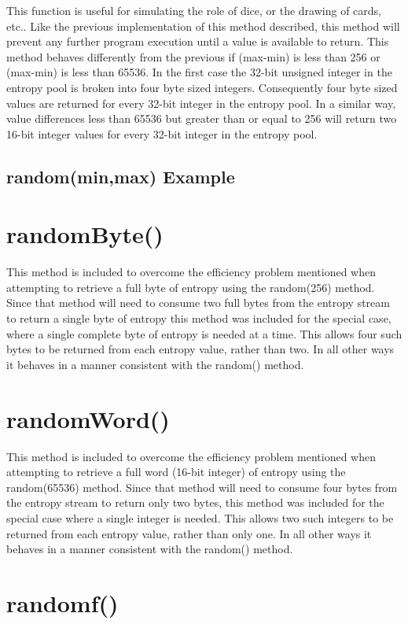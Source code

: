 \documentclass[10pt]{report}
\newcommand{\code}[2]{
 \hrulefill
 \subsection*{#1}
 
 \vspace{2em}
}
\begin{document}
This function is useful for simulating the role of dice, or the drawing of cards, etc..  Like the previous 
implementation of this method described, this method will prevent any further program execution until a value 
is available to return.  This method behaves differently from the previous if (max-min) is less than 256 or 
(max-min) is less than 65536.  In the first case the 32-bit unsigned integer in the entropy pool is broken 
into four byte sized integers. Consequently four byte sized values are returned for every 32-bit integer in 
the entropy pool.  In a similar way, value differences less than 65536 but greater than or equal to 256 will 
return two 16-bit integer values for every 32-bit integer in the entropy pool. 

\code{random(min,max) Example}{random_minmax_example.ino}

\section{randomByte()} 

This method is included to overcome the efficiency problem mentioned when attempting to retrieve a full byte 
of entropy using the random(256) method.  Since that method will need to consume two full bytes from the 
entropy stream to return a single byte of entropy this method was included for the special case, where a 
single complete byte of entropy is needed at a time.  This allows four such bytes to be returned from each 
entropy value, rather than two.  In all other ways it behaves in a manner consistent with the random() 
method.

\section{randomWord()}

This method is included to overcome the efficiency problem mentioned when attempting to retrieve a full word 
(16-bit integer) of entropy using the random(65536) method.  Since that method will need to consume four bytes 
from the entropy stream to return only two bytes, this method was included for the special case where a single 
integer is needed.  This allows two such integers to be returned from each entropy value, rather than only 
one.  In all other ways it behaves in a manner consistent with the random() method.


\section{randomf()}
\end{document}
